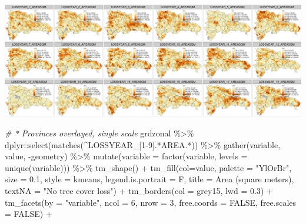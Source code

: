 \documentclass[10pt,landscape,a3paper]{article}
\newenvironment{Shaded}{\begin{snugshade}}{\end{snugshade}}
\newcommand{\AttributeTok}[1]{\textcolor[rgb]{0.77,0.63,0.00}{#1}}
\newcommand{\CommentTok}[1]{\textcolor[rgb]{0.56,0.35,0.01}{\textit{#1}}}
\newcommand{\ConstantTok}[1]{\textcolor[rgb]{0.00,0.00,0.00}{#1}}
\newcommand{\DecValTok}[1]{\textcolor[rgb]{0.00,0.00,0.81}{#1}}
\newcommand{\FloatTok}[1]{\textcolor[rgb]{0.00,0.00,0.81}{#1}}
\newcommand{\FunctionTok}[1]{\textcolor[rgb]{0.00,0.00,0.00}{#1}}
\newcommand{\NormalTok}[1]{#1}
\newcommand{\SpecialCharTok}[1]{\textcolor[rgb]{0.00,0.00,0.00}{#1}}
\newcommand{\StringTok}[1]{\textcolor[rgb]{0.31,0.60,0.02}{#1}}
\begin{document}
\begin{center}\includegraphics{img/zonal-long-term-grid-4} \end{center}

\begin{Shaded}
\begin{Highlighting}[]
\CommentTok{\# * Provinces overlayed, single scale}
\NormalTok{grdzonal }\SpecialCharTok{\%\textgreater{}\%}\NormalTok{ dplyr}\SpecialCharTok{::}\FunctionTok{select}\NormalTok{(}\FunctionTok{matches}\NormalTok{(}\StringTok{\textquotesingle{}\^{}LOSSYEAR\_[1{-}9].*AREA.*\textquotesingle{}}\NormalTok{)) }\SpecialCharTok{\%\textgreater{}\%}
  \FunctionTok{gather}\NormalTok{(variable, value, }\SpecialCharTok{{-}}\NormalTok{geometry) }\SpecialCharTok{\%\textgreater{}\%}
  \FunctionTok{mutate}\NormalTok{(}\AttributeTok{variable =} \FunctionTok{factor}\NormalTok{(variable, }\AttributeTok{levels =} \FunctionTok{unique}\NormalTok{(variable))) }\SpecialCharTok{\%\textgreater{}\%} 
  \FunctionTok{tm\_shape}\NormalTok{() }\SpecialCharTok{+}
  \FunctionTok{tm\_fill}\NormalTok{(}\AttributeTok{col=}\StringTok{\textquotesingle{}value\textquotesingle{}}\NormalTok{, }\AttributeTok{palette =} \StringTok{"YlOrBr"}\NormalTok{, }\AttributeTok{size =} \FloatTok{0.1}\NormalTok{,}
          \AttributeTok{style =} \StringTok{\textquotesingle{}kmeans\textquotesingle{}}\NormalTok{, }\AttributeTok{legend.is.portrait =}\NormalTok{ F, }\AttributeTok{title =} \StringTok{\textquotesingle{}Area (square meters)\textquotesingle{}}\NormalTok{,}
          \AttributeTok{textNA =} \StringTok{"No tree cover loss"}\NormalTok{) }\SpecialCharTok{+}
  \FunctionTok{tm\_borders}\NormalTok{(}\AttributeTok{col =} \StringTok{\textquotesingle{}grey15\textquotesingle{}}\NormalTok{, }\AttributeTok{lwd =} \FloatTok{0.3}\NormalTok{) }\SpecialCharTok{+}
  \FunctionTok{tm\_facets}\NormalTok{(}\AttributeTok{by =} \StringTok{"variable"}\NormalTok{, }\AttributeTok{ncol =} \DecValTok{6}\NormalTok{, }\AttributeTok{nrow =} \DecValTok{3}\NormalTok{, }\AttributeTok{free.coords =} \ConstantTok{FALSE}\NormalTok{, }\AttributeTok{free.scales =} \ConstantTok{FALSE}\NormalTok{) }\SpecialCharTok{+}

\end{Highlighting}
\end{Shaded}
\end{document}
